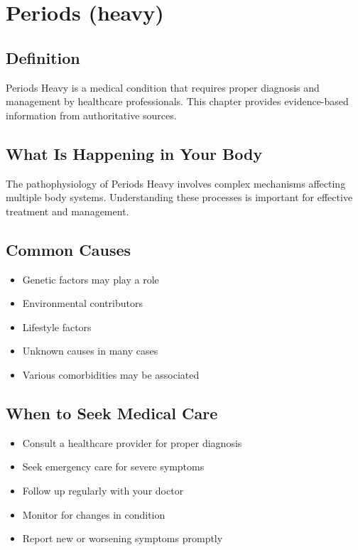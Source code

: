 
\chapter{Periods (heavy)}

\section*{Definition}
Periods Heavy is a medical condition that requires proper diagnosis and management by healthcare professionals. This chapter provides evidence-based information from authoritative sources.

\section*{What Is Happening in Your Body}
The pathophysiology of Periods Heavy involves complex mechanisms affecting multiple body systems. Understanding these processes is important for effective treatment and management.

\section*{Common Causes}
\begin{itemize}
  \item Genetic factors may play a role
  \item Environmental contributors
  \item Lifestyle factors
  \item Unknown causes in many cases
  \item Various comorbidities may be associated
\end{itemize}

\section*{When to Seek Medical Care}
\begin{itemize}
  \item Consult a healthcare provider for proper diagnosis
  \item Seek emergency care for severe symptoms
  \item Follow up regularly with your doctor
  \item Monitor for changes in condition
  \item Report new or worsening symptoms promptly
\end{itemize}

